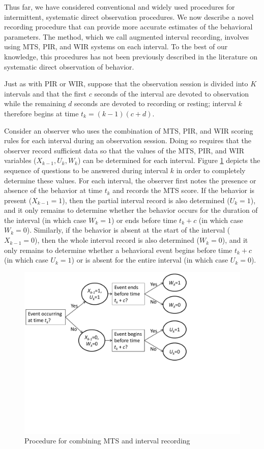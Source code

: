 \documentclass[man, noextraspace, floatsintext]{apa6}\usepackage[]{graphicx}\usepackage[]{color}
\begin{document}
Thus far, we have considered conventional and widely used procedures for intermittent, systematic direct observation procedures. 
We now describe a novel recording procedure that can provide more accurate estimates of the behavioral parameters. 
The method, which we call augmented interval recording, involves using MTS, PIR, and WIR systems on each interval. 
To the best of our knowledge, this procedures has not been previously described in the literature on systematic direct observation of behavior. 

Just as with PIR or WIR, suppose that the observation session is divided into $K$ intervals and that the first $c$ seconds of the interval are devoted to observation while the remaining $d$ seconds are devoted to recording or resting; interval $k$ therefore begins at time $t_k = (k - 1)(c + d)$. 

Consider an observer who uses the combination of MTS, PIR, and WIR scoring rules for each interval during an observation session. 
Doing so requires that the observer record sufficient data so that the values of the MTS, PIR, and WIR variables ($X_{k-1},U_k,W_k$) can be determined for each interval. 
Figure \ref{fig:questions} depicts the sequence of questions to be answered during interval $k$ in order to completely determine these values. 
For each interval, the observer first notes the presence or absence of the behavior at time $t_k$ and records the MTS score. 
If the behavior is present ($X_{k-1} = 1$), then the partial interval record is also determined ($U_k = 1$), and it only remains to determine whether the behavior occurs for the duration of the interval (in which case $W_k = 1$) or ends before time $t_k + c$ (in which case $W_k = 0$). 
Similarly, if the behavior is absent at the start of the interval ($X_{k-1} = 0$), then the whole interval record is also determined ($W_k = 0$), and it only remains to determine whether a behavioral event begins before time $t_k + c$ (in which case $U_k = 1$) or is absent for the entire interval (in which case $U_k = 0$). 

\begin{figure}[hbtp]
\centering
\includegraphics[clip=true, trim= 0 240 150 00, width=0.8\linewidth]{AIR_flowchart.pdf}
\caption{Procedure for combining MTS and interval recording}
\label{fig:questions}
\end{figure}  
\end{document}
